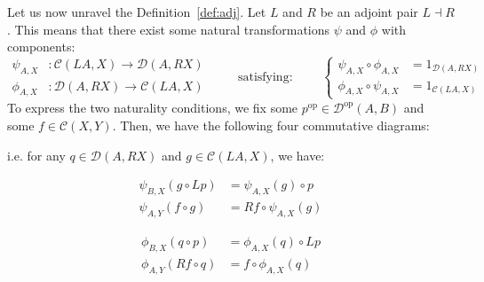 Let us now unravel the Definition~\ref{def:adj}. Let $L$ and $R$ be an adjoint pair $L\dashv R$. This means that there exist some natural transformations $\psi$ and $\phi$ with components:
\[\begin{aligned}
\psi_{A,X}&:\mathcal{C}(LA,X)\to\mathcal{D}(A,RX)\\[0.8em]
\phi_{A,X}&:\mathcal{D}(A,RX)\to\mathcal{C}(LA,X)
\end{aligned}\qquad\text{ satisfying: }\qquad
\left\{\begin{aligned}
\psi_{A,X}\circ\phi_{A,X}&=1_{\mathcal{D}(A,RX)}\\[0.8em]
\phi_{A,X}\circ\psi_{A,X}&=1_{\mathcal{C}(LA,X)}
\end{aligned}\right.\]
To express the two naturality conditions, we fix some $p^{\mathrm{op}}\in\mathcal{D}^{\mathrm{op}}(A,B)$ and some $f\in\mathcal{C}(X,Y)$. Then, we have the following four commutative diagrams:
\begin{center}
\end{center}
i.e. for any $q\in\mathcal{D}(A,RX)$ and $g\in\mathcal{C}(LA,X)$, we have:
\begin{center}
\begin{minipage}{0.5\linewidth}
\begin{align}
\psi_{B,X}(g\circ Lp)&=\psi_{A,X}(g)\circ p\label{psiL}\\[1em]
\psi_{A,Y}(f\circ g)&=Rf\circ \psi_{A,X}(g)\label{psiR}
\end{align}
\end{minipage}\begin{minipage}{0.5\linewidth}
\begin{align}
\phi_{B,X}(q\circ p)&=\phi_{A,X}(q)\circ Lp\label{phiL}\\[1em]
\phi_{A,Y}(Rf\circ q)&=f\circ \phi_{A,X}(q)\label{phiR}
\end{align}
\end{minipage}
\end{center}
